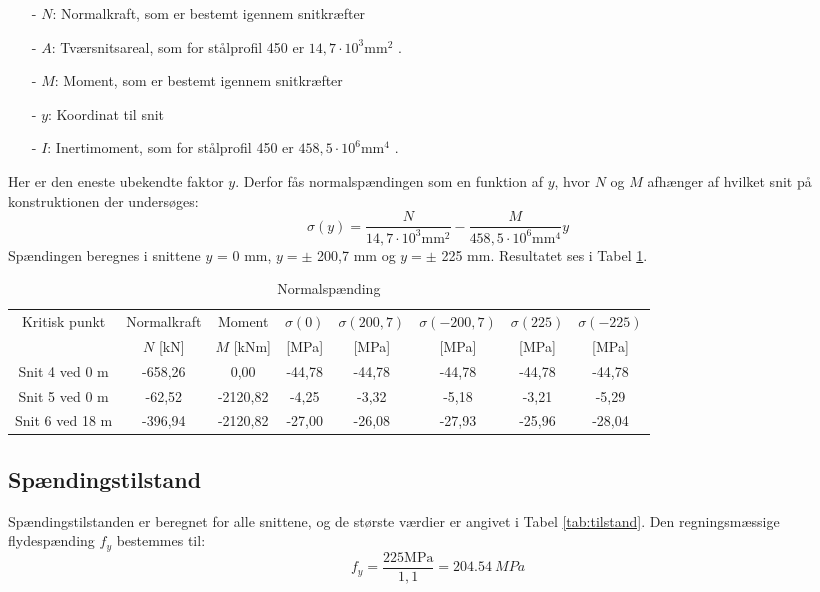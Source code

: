\begin{itemize}
	\item[-] $N$: Normalkraft, som er bestemt igennem snitkræfter
	\item[-] $A$: Tværsnitsareal, som for stålprofil 450 er $14,\!7 \cdot 10^3 \text{mm}^2$ \citep{stabi}. 
	\item[-] $M$: Moment, som er bestemt igennem snitkræfter
	\item[-] $y$: Koordinat til snit
	\item[-] $I$: Inertimoment, som for stålprofil 450 er $458,\!5 \cdot 10^6 \text{mm}^4$ \citep{stabi}. 
\end{itemize} 

Her er den eneste ubekendte faktor $y$. Derfor fås normalspændingen som en funktion af $y$, hvor $N$ og $M$ afhænger af hvilket snit på konstruktionen der undersøges:
\begin{equation}
	\sigma(y) = \frac{N}{14,\!7 \cdot 10^3 \text{mm}^2} - \frac{M}{458,\!5 \cdot 10^6 \text{mm}^4} y
\end{equation}
Spændingen beregnes i snittene $y$ = 0 mm, $y = \pm$ 200,7 mm og $y = \pm$ 225 mm. Resultatet ses i Tabel \ref{tab:normalspanding}.

\begin{table} [H]
	\begin{center}
		\begin{tabular}{c c c c c c c c }
			\hline
			Kritisk punkt   & Normalkraft & Moment & $\sigma(0)$ & $\sigma(200,7)$ & $\sigma(-200,7)$ & $\sigma(225)$ & $\sigma(-225)$  \\
			& $N$ [kN] & $M$ [kNm] & [MPa] & [MPa] & [MPa] & [MPa] & [MPa] \\ \hline
			Snit 4 ved 0 m  & -658,26           & 0,00                   & -44,78      & -44,78          & -44,78          & -44,78        & -44,78       \\ \hline
			Snit 5 ved 0 m  & -62,52          & -2120,82      & -4,25     & -3,32         & -5,18          & -3,21        & -5,29        \\ \hline
			Snit 6 ved 18 m & -396,94           & -2120,82        & -27,00      & -26,08         & -27,93          & -25,96        & -28,04                     \\ \hline
		\end{tabular}
		\caption{Normalspænding}
		\label{tab:normalspanding}
	\end{center}
\end{table}

\subsection{Spændingstilstand}
Spændingstilstanden er beregnet for alle snittene, og de største værdier er angivet i Tabel \ref{tab:tilstand}.
\newline
\newline
Den regningsmæssige flydespænding $f_y$ bestemmes til:
\begin{equation}
f_y = \frac{225 \text{MPa}}{1,\!1} = \SI{204,54}{MPa}
\end{equation}

